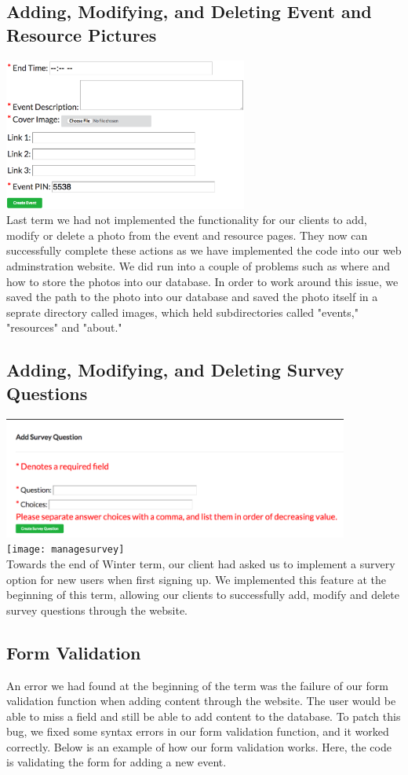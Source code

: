 \documentclass[onecolumn, draftclsnofoot,10pt, compsoc]{IEEEtran}
\begin{document}
  \subsection{Adding, Modifying, and Deleting Event and Resource Pictures}
    \includegraphics[height=5cm]{addcoverimage} \\
    Last term we had not implemented the functionality for our clients to add, modify or delete a photo from the event and resource pages. They now can successfully complete these actions as we have implemented the code into our web adminstration website. We did run into a couple of problems such as where and how to store the photos into our database. In order to work around this issue, we saved the path to the photo into our database and saved the photo itself in a seprate directory called images, which held subdirectories called "events," "resources" and "about."

  \subsection{Adding, Modifying, and Deleting Survey Questions}
    \includegraphics[height=4cm]{addsurveyquestion} \\
    \texttt{[image: managesurvey]} \\
    Towards the end of Winter term, our client had asked us to implement a survery option for new users when first signing up. We implemented this feature at the beginning of this term, allowing our clients to successfully add, modify and delete survey questions through the website.

  \subsection{Form Validation}
    An error we had found at the beginning of the term was the failure of our form validation function when adding content through the website. The user would be able to miss a field and still be able to add content to the database. To patch this bug, we fixed some syntax errors in our form validation function, and it worked correctly. Below is an example of how our form validation works. Here, the code is validating the form for adding a new event.
\end{document}
